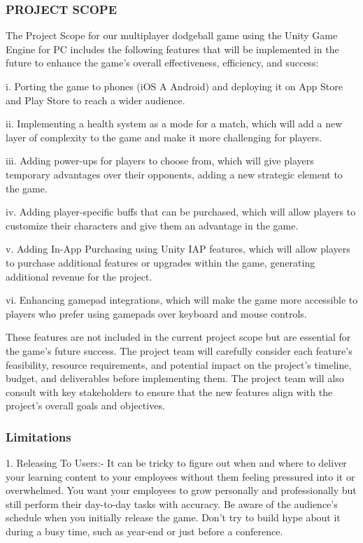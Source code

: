 \documentclass[12pt]{report}
\begin{document}
\subsubsection{PROJECT SCOPE}
\justifying
\setlength{\parindent}{2em}
\setlength{\parskip}{0.5em}
\renewcommand{\baselinestretch}{1.5}
\normalsize \hspace{1.7cm} The Project Scope for our multiplayer dodgeball game using the Unity Game Engine for PC includes the following features that will be implemented in the future to enhance the game's overall effectiveness, efficiency, and success:

i. Porting the game to phones (iOS A Android) and deploying it on App Store and Play Store to reach a wider audience.

ii. Implementing a health system as a mode for a match, which will add a new layer of complexity to the game and make it more challenging for players.

iii. Adding power-ups for players to choose from, which will give players temporary advantages over their opponents, adding a new strategic element to the game.

iv. Adding player-specific buffs that can be purchased, which will allow players to customize their characters and give them an advantage in the game.

v. Adding In-App Purchasing using Unity IAP features, which will allow players to purchase additional features or upgrades within the game, generating additional revenue for the project.

vi. Enhancing gamepad integrations, which will make the game more accessible to players who prefer using gamepads over keyboard and mouse controls.

These features are not included in the current project scope but are essential for the game's future success. The project team will carefully consider each feature's feasibility, resource requirements, and potential impact on the project's timeline, budget, and deliverables before implementing them. The project team will also consult with key stakeholders to ensure that the new features align with the project's overall goals and objectives.

\subsubsection{Limitations}
\justifying
\setlength{\parindent}{2em}
\setlength{\parskip}{0.5em}
\renewcommand{\baselinestretch}{1.5}
\normalsize \hspace{1.7cm} 1. Releasing To Users:- It can be tricky to figure out when and where to deliver your learning content to your employees without them feeling pressured into it or overwhelmed. You want your employees to grow personally and professionally but still perform their day-to-day tasks with accuracy. Be aware of the audience’s schedule when you initially release the game. Don’t try to build hype about it during a busy time, such as year-end or just before a conference. 
\end{document}
